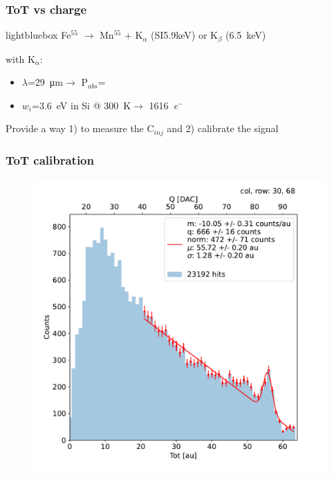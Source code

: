     \begin{frame}
        \frametitle{ToT vs charge }
        \begin{beamercolorbox}[sep=0em,wd=0.85\textwidth,ht=1.5ex, dp=0.1ex, rounded=true, center]{lightbluebox}
            Fe$^{55}$ $\rightarrow$ Mn$^{55}$ + K$_\alpha$ (SI{5.9}{keV}) or K$_\beta$ (\SI{6.5}{keV})
        \end{beamercolorbox}
        with K$_\alpha$:
        \begin{itemize}
            \item $\lambda$=\SI{29}{\um}$\rightarrow$ P$_{abs}$=
            \item $w_i$=\SI{3.6}{eV} in Si @ \SI{300}{\kelvin}$\rightarrow$ \SI{1616}{\elementarycharge}$^-$
        \end{itemize}

        Provide a way 1) to measure the C$_{inj}$ and 2) calibrate the signal

    \end{frame}        

    \begin{frame}
        \frametitle{ToT calibration}
            \begin{figure}[h!]
                \centering
                \includegraphics[width=.99\linewidth]{figures/charaterization/fit_line_gauss_r69.pdf}
            \end{figure}

    \end{frame}     


